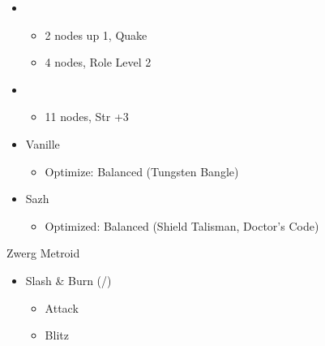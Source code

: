\begin{menu}
\begin{itemize}
\begin{itemize}
\begin{itemize}
\begin{itemize}
					                  \end{itemize}
					            \item \sab
					                  \begin{itemize}
						                  \item 2 nodes up 1, Quake
						                  \item 4 nodes, Role Level 2
					                  \end{itemize}
					            \item \med
					                  \begin{itemize}
						                  \item 11 nodes, Str +3
					                  \end{itemize}
				            \end{itemize}
			      \end{itemize}
			      \columnbreak
			      \equip
			      \begin{itemize}
				      \item Vanille
				            \begin{itemize}
					            \item \begin{flushleft}Optimize: Balanced (Tungsten Bangle)\end{flushleft}
				            \end{itemize}
				      \item Sazh
				            \begin{itemize}
					            \item \begin{flushleft}Optimized: Balanced (Shield Talisman, Doctor's Code)\end{flushleft}
				            \end{itemize}
			      \end{itemize}
		\end{itemize}
	\end{menu}
	\renewcommand{\first}{[1] Slash \& Burn (\com/\rav)}
	\renewcommand{\second}{[2] War \& Peace (\com/\med)}
	\renewcommand{\third}{[3] Tide Turner (\syn/\sab)}
	\renewcommand{\fourth}{[4] }
	\renewcommand{\fifth}{[5] Undermine (\rav/\sab)}
	\renewcommand{\sixth}{[6] Divide \& Conquer (\com/\sab)}

	\begin{battle}[0:05]{Zwerg Metroid}
		\begin{itemize}
			\item \first
			      \begin{itemize}
				      \item Attack
				      \item Blitz
			      \end{itemize}
		\end{itemize}
	\end{battle}


